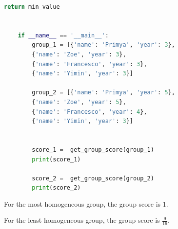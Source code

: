 \documentclass[12pt]{article}
\begin{document}
\begin{itemize}
\begin{lstlisting}[language=Python]
        return min_value


    if __name__ == '__main__':
        group_1 = [{'name': 'Primya', 'year': 3},
        {'name': 'Zoe', 'year': 3},
        {'name': 'Francesco', 'year': 3},
        {'name': 'Yimin', 'year': 3}]

        group_2 = [{'name': 'Primya', 'year': 5},
        {'name': 'Zoe', 'year': 5},
        {'name': 'Francesco', 'year': 4},
        {'name': 'Yimin', 'year': 3}]


        score_1 =  get_group_score(group_1)
        print(score_1)

        score_2 =  get_group_score(group_2)
        print(score_2)


    \end{lstlisting}

    \bigskip

    For the most homogeneous group, the group score is 1.

    \bigskip

    For the least homogeneous group, the group score is $\frac{9}{16}$.

\end{itemize}

\bigskip
\end{document}
